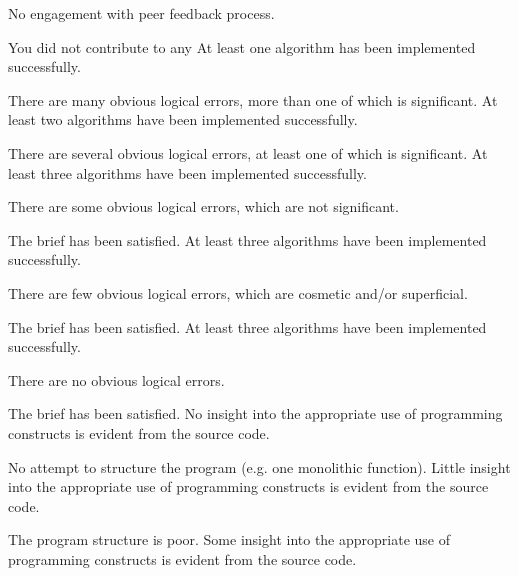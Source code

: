 \documentclass{../../fal_assignment}
\begin{document}
\rubrichead
\begin{markingrubric}
	\grade\fail 	No engagement with peer feedback process.
	\par 		You did not contribute to any 
	\grade 		At least one algorithm has been  implemented successfully.
	\par 		There are many obvious logical errors, more than one of which is significant.   
	\grade 		At least two algorithms have been  implemented successfully.
	\par 		There are several obvious logical errors, at least one of which is significant. 
	\grade 		At least three algorithms have been  implemented successfully.
	\par 		There are some obvious logical errors, which are not significant. 
	\par		The brief has been satisfied.
	\grade 		At least three algorithms have been  implemented successfully.
	\par 		There are few obvious logical errors, which are cosmetic and/or superficial.
	\par		The brief has been satisfied.     
	\grade 		At least three algorithms have been  implemented successfully.
	\par		There are no obvious logical errors.
	\par		The brief has been satisfied.
	\grade\fail No insight into the appropriate use of programming constructs is evident from the source code.
	\par No attempt to structure the program (e.g. one monolithic function).
	\grade Little insight into the appropriate use of programming constructs is evident from the source code.
	\par The program structure is poor.
	\grade Some insight into the appropriate use of programming constructs is evident from the source code.

\end{markingrubric}
\end{document}
